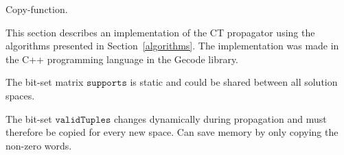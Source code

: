 \documentclass[a4paper,11pt]{article}
\newcommand{\Todo}[1]{{\color{blue}#1}}
\newcommand{\Chapref}[1]{Section~\ref{#1}}
\newcommand{\CurrTable}{\texttt{validTuples}}
\newcommand{\Supports}{\texttt{supports}}
\numberwithin{equation}{section}
\begin{document}

\Todo{Copy-function.}




This section describes an implementation of the CT propagator using the algorithms
presented in \Chapref{algorithms}. The implementation was made in the C++ programming
language in the Gecode library.

The bit-set matrix $\Supports$ is static and could be shared between all solution spaces.

The bit-set $\CurrTable$ changes dynamically during propagation and must therefore be copied for
every new space. Can save memory by only copying the non-zero words.
\end{document}
